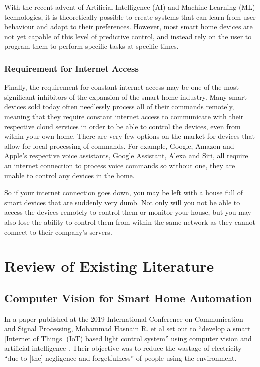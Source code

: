With the recent advent of Artificial Intelligence (AI) and Machine Learning (ML) technologies, it is theoretically possible to create systems that can learn from user behaviour and adapt to their preferences.
However, most smart home devices are not yet capable of this level of predictive control, and instead rely on the user to program them to perform specific tasks at specific times.

\subsubsection{Requirement for Internet Access}
Finally, the requirement for constant internet access may be one of the most significant inhibitors of the expansion of the smart home industry.
Many smart devices sold today often needlessly process all of their commands remotely, meaning that they require constant internet access to communicate with their respective cloud services in order to be able to control the devices, even from within your own home.
There are very few options on the market for devices that allow for local processing of commands.
For example, Google, Amazon and Apple's respective voice assistants, Google Assistant, Alexa and Siri, all require an internet connection to process voice commands so without one, they are unable to control any devices in the home.

So if your internet connection goes down, you may be left with a house full of smart devices that are suddenly very dumb.
Not only will you not be able to access the devices remotely to control them or monitor your house, but you may also lose the ability to control them from within the same network as they cannot connect to their company's servers.

\section{Review of Existing Literature}

\subsection{Computer Vision for Smart Home Automation}
In a paper published at the 2019 International Conference on Communication and Signal Processing, Mohammad Hasnain R. et al set out to ``develop a smart [Internet of Things] (IoT) based light control system'' using computer vision and artificial intelligence \cite{Hasn19}.
Their objective was to reduce the wastage of electricity ``due to [the] negligence and forgetfulness'' of people using the environment.

